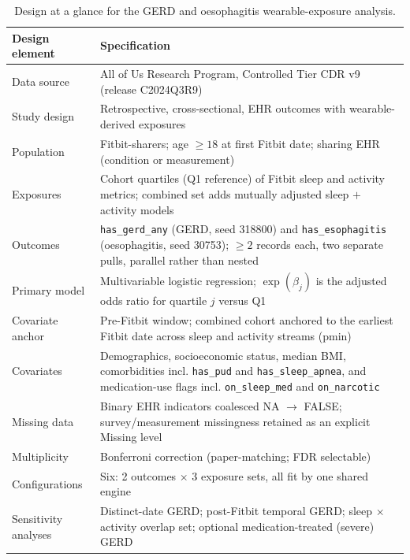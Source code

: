 \documentclass[11pt]{article}
\newcommand{\code}[1]{\texttt{\small #1}}
\begin{document}
\begin{table}[h]
\centering
\footnotesize
\begin{tabular}{@{}lp{9.2cm}@{}}
\toprule
Design element & Specification \\
\midrule
Data source & All of Us Research Program, Controlled Tier CDR v9 (release C2024Q3R9) \\
\addlinespace
Study design & Retrospective, cross-sectional, EHR outcomes with wearable-derived exposures \\
\addlinespace
Population & Fitbit-sharers; age $\geq 18$ at first Fitbit date; sharing EHR (condition or measurement) \\
\addlinespace
Exposures & Cohort quartiles (Q1 reference) of Fitbit sleep and activity metrics; combined set adds mutually adjusted sleep $+$ activity models \\
\addlinespace
Outcomes & \code{has_gerd_any} (GERD, seed 318800) and
\code{has_esophagitis} (oesophagitis, seed 30753); $\geq 2$ records each, two separate pulls,
parallel rather than nested \\
\addlinespace
Primary model & Multivariable logistic regression; $\exp(\beta_j)$ is the adjusted odds ratio for quartile $j$ versus Q1 \\
\addlinespace
Covariate anchor & Pre-Fitbit window; combined cohort anchored to the earliest Fitbit date across sleep and activity streams ($\mathrm{pmin}$) \\
\addlinespace
Covariates & Demographics, socioeconomic status, median BMI, comorbidities incl. \code{has_pud} and \code{has_sleep_apnea}, and medication-use flags incl. \code{on_sleep_med} and \code{on_narcotic} \\
\addlinespace
Missing data & Binary EHR indicators coalesced NA $\rightarrow$ FALSE; survey/measurement missingness retained as an explicit Missing level \\
\addlinespace
Multiplicity & Bonferroni correction (paper-matching; FDR selectable) \\
\addlinespace
Configurations & Six: 2 outcomes $\times$ 3 exposure sets, all fit by one shared engine \\
\addlinespace
Sensitivity analyses & Distinct-date GERD; post-Fitbit temporal GERD; sleep $\times$ activity overlap set; optional medication-treated (severe) GERD \\
\bottomrule
\end{tabular}
\caption{Design at a glance for the GERD and oesophagitis wearable-exposure analysis.}
\label{tab:design-glance}
\end{table}
\end{document}
